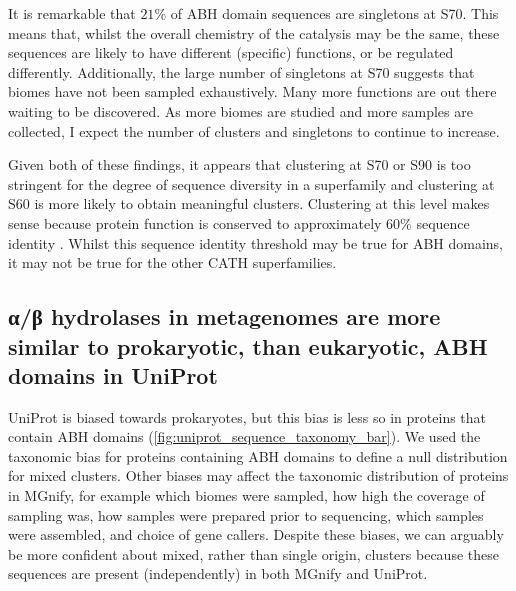 It is remarkable that $21\%$ of ABH domain sequences are singletons at S70. This means that, whilst the overall chemistry of the catalysis may be the same, these sequences are likely to have different (specific) functions, or be regulated differently. Additionally, the large number of singletons at S70 suggests that biomes have not been sampled exhaustively. Many more functions are out there waiting to be discovered. As more biomes are studied and more samples are collected, I expect the number of clusters and singletons to continue to increase.

Given both of these findings, it appears that clustering at S70 or S90 is too stringent for the degree of sequence diversity in a superfamily and clustering at S60 is more likely to obtain meaningful clusters. Clustering at this level makes sense because protein function is conserved to approximately $60\%$ sequence identity \cite{Rost2002,Rentzsch2009}. Whilst this sequence identity threshold may be true for ABH domains, it may not be true for the other CATH superfamilies.

\subsection{α/β hydrolases in metagenomes are more similar to prokaryotic, than eukaryotic, ABH domains in UniProt}
\label{sec:discussion-prok-euk}

UniProt is biased towards prokaryotes, but this bias is less so in proteins that contain ABH domains (\ref{fig:uniprot_sequence_taxonomy_bar}). We used the taxonomic bias for proteins containing ABH domains to define a null distribution for mixed clusters. Other biases may affect the taxonomic distribution of proteins in MGnify, for example which biomes were sampled, how high the coverage of sampling was, how samples were prepared prior to sequencing, which samples were assembled, and choice of gene callers. Despite these biases, we can arguably be more confident about mixed, rather than single origin, clusters because these sequences are present (independently) in both MGnify and UniProt.

